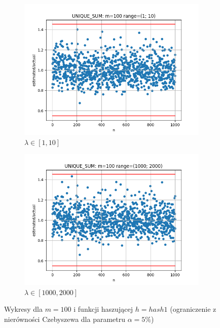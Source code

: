 \documentclass{article}
\begin{document}
\begin{figure}[H]
        \begin{subfigure}{0.6\textwidth}
            \centering
            \includegraphics[width=\linewidth]{sum/zad1_range_1_10_cheb_5.png}
            \caption{$\lambda \in [1, 10]$}
        \end{subfigure}
        \begin{subfigure}{0.6\textwidth}
            \centering
            \includegraphics[width=\linewidth]{sum/zad1_range_1000_2000_cheb_5.png}
            \caption{$\lambda \in [1000, 2000]$}
        \end{subfigure}
        \caption{Wykresy dla $m = 100$ i funkcji haszującej $h = hash1$ (ograniczenie z nierówności Czebyszewa dla parametru $\alpha = 5\%$)}
    \end{figure}
\end{document}
